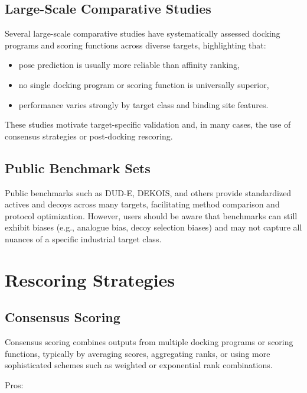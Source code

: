 \documentclass[12pt,a4paper]{article}
\begin{document}
\subsection{Large-Scale Comparative Studies}

Several large-scale comparative studies have systematically assessed docking programs and scoring functions across diverse targets, highlighting that:

\begin{itemize}
  \item pose prediction is usually more reliable than affinity ranking,
  \item no single docking program or scoring function is universally superior,
  \item performance varies strongly by target class and binding site features.\cite{CH8_Warren2006,CH8_Cheng2009,CH8_wang2005}
\end{itemize}

These studies motivate target-specific validation and, in many cases, the use of consensus strategies or post-docking rescoring.

\subsection{Public Benchmark Sets}

Public benchmarks such as DUD-E, DEKOIS, and others provide standardized actives and decoys across many targets, facilitating method comparison and protocol optimization.\cite{CH8_DUD-E2012} However, users should be aware that benchmarks can still exhibit biases (e.g., analogue bias, decoy selection biases) and may not capture all nuances of a specific industrial target class.

\section{Rescoring Strategies}

\subsection{Consensus Scoring}

Consensus scoring combines outputs from multiple docking programs or scoring functions, typically by averaging scores, aggregating ranks, or using more sophisticated schemes such as weighted or exponential rank combinations.\cite{CH8_Cheng2009,CH8_ConsensusDocking2022}

Pros:
\end{document}

